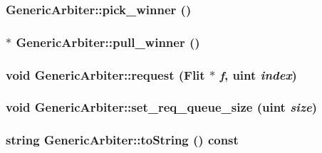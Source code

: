 \hypertarget{classGenericArbiter_4a5b38f3d16471a75c0c35fc1ecb3031}{
\subsubsection[{pick\_\-winner}]{ GenericArbiter::pick\_\-winner ()}}
\label{classGenericArbiter_4a5b38f3d16471a75c0c35fc1ecb3031}


\hypertarget{classGenericArbiter_16e40d95e115c183d604611c6e4c875c}{
\subsubsection[{pull\_\-winner}]{ $\ast$ GenericArbiter::pull\_\-winner ()}}
\label{classGenericArbiter_16e40d95e115c183d604611c6e4c875c}


\hypertarget{classGenericArbiter_2ecaad77822910dd7353c8c03f116690}{
\subsubsection[{request}]{\setlength{\rightskip}{0pt plus 5cm}void GenericArbiter::request ({\bf Flit} $\ast$ {\em f}, \/  {\bf uint} {\em index})}}
\label{classGenericArbiter_2ecaad77822910dd7353c8c03f116690}


\hypertarget{classGenericArbiter_adbe3775870bfc27a5f57e37d73cec5b}{
\subsubsection[{set\_\-req\_\-queue\_\-size}]{\setlength{\rightskip}{0pt plus 5cm}void GenericArbiter::set\_\-req\_\-queue\_\-size ({\bf uint} {\em size})}}
\label{classGenericArbiter_adbe3775870bfc27a5f57e37d73cec5b}


\hypertarget{classGenericArbiter_dfd7645d22ce13eb428e73fd9fa34b63}{
\subsubsection[{toString}]{\setlength{\rightskip}{0pt plus 5cm}string GenericArbiter::toString () const}}
\label{classGenericArbiter_dfd7645d22ce13eb428e73fd9fa34b63}




